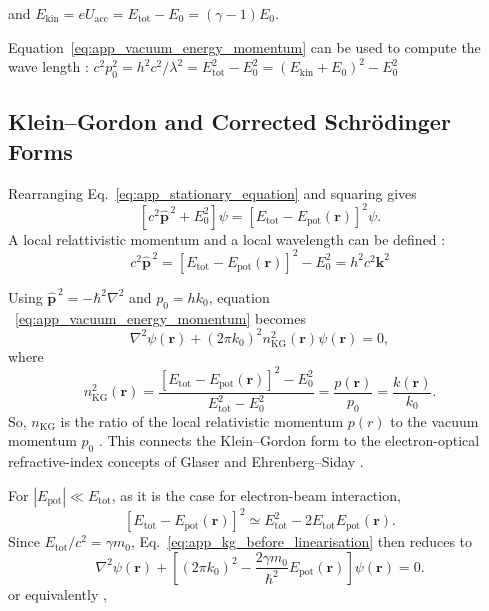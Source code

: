 \documentclass[12pt]{article}
\begin{document}
and $E_{\mathrm{kin}}=eU_{\mathrm{acc}}=E_{\mathrm{tot}}-E_0 = (\gamma - 1) E_0$. 

Equation~\eqref{eq:app_vacuum_energy_momentum} can be used to compute the wave length : 
$c^2 p_0^2 = h^2 c^2/\lambda^2 = E_{\mathrm{tot}}^2 - E_0^2 = (E_{\mathrm{kin}}+E_0)^2 - E_0^2$ 


\subsection{Klein--Gordon and Corrected Schr\"odinger Forms}

Rearranging Eq.~\eqref{eq:app_stationary_equation} and squaring gives
\begin{equation}
\left[c^2\hat{\mathbf p}^{\,2}+E_0^2\right]\psi
=
\left[E_{\mathrm{tot}}-E_{\mathrm{pot}}(\mathbf r)\right]^2\psi .
\label{eq:app_kg_before_linearisation}
\end{equation}
A local relattivistic momentum and a local wavelength can be defined : 
\begin{equation}
c^2\hat{\mathbf p}^{\,2}
=
\left[E_{\mathrm{tot}}-E_{\mathrm{pot}}(\mathbf r)\right]^2 - E_0^2 = h^2 c^2 \mathbf k^2
\label{eq:app_kg_before_linearisation2}
\end{equation}

Using $\hat{\mathbf p}^{\,2}=-\hbar^2\nabla^2$ and
$p_0=h k_0$, equation ~\eqref{eq:app_vacuum_energy_momentum} becomes
\begin{equation}
\nabla^2\psi(\mathbf r)
+
(2\pi k_0)^2n_{\mathrm{KG}}^2(\mathbf r)\psi(\mathbf r)
=0,
\label{eq:app_kg_helmholtz_form}
\end{equation}
where
\begin{equation}
n_{\mathrm{KG}}^2(\mathbf r)
=
\frac{
\left[E_{\mathrm{tot}}-E_{\mathrm{pot}}(\mathbf r)\right]^2-E_0^2
} {
E_{\mathrm{tot}}^2-E_0^2
} = \frac{p(\mathbf r)}{p_0}=\frac{k(\mathbf r)}{k_0}
.
\label{eq:app_kg_refractive_index}
\end{equation}
So, $n_{\mathrm{KG}}$ is the ratio of the local relativistic 
momentum $p(r)$  to the vacuum momentum $p_0$ . This connects the Klein--Gordon form to the
electron-optical refractive-index concepts of Glaser and Ehrenberg--Siday
\cite{Glaser1933,Ehrenberg-Siday1949}.

For $|E_{\mathrm{pot}}|\ll E_{\mathrm{tot}}$, as it is the case for electron-beam interaction, 
\begin{equation}
\left[E_{\mathrm{tot}}-E_{\mathrm{pot}}(\mathbf r)\right]^2
\simeq
E_{\mathrm{tot}}^2
-
2E_{\mathrm{tot}}E_{\mathrm{pot}}(\mathbf r).
\label{eq:app_linearised_energy}
\end{equation}
Since $E_{\mathrm{tot}}/c^2=\gamma m_0$, Eq.~\eqref{eq:app_kg_before_linearisation}
then reduces to
\begin{equation}
\nabla^2\psi(\mathbf r)
+
\left[
(2\pi k_0)^2
-
\frac{2\gamma m_0}{\hbar^2}E_{\mathrm{pot}}(\mathbf r)
\right]\psi(\mathbf r)
=0.
\label{eq:app_corrected_schrodinger}
\end{equation} or equivalently , 
\end{document}
